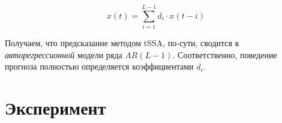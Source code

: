	    	 \begin{equation*}\label{eq:autoregr}
	    	 	x(t) = \sum\limits_{i = 1}^{L - 1} d_i \cdot x(t - i)
	    	 \end{equation*}
	    	 
	    	 Получаем, что предсказание методом tSSA, по-сути, сводится к \textit{авторегрессионной} модели ряда $ AR(L - 1) $. Соответственно, поведение прогноза полностью определяется коэффициентами $ d_i $.
	    
	\section{Эксперимент}	
			
		
		\newpage
		\printbibliography
	
